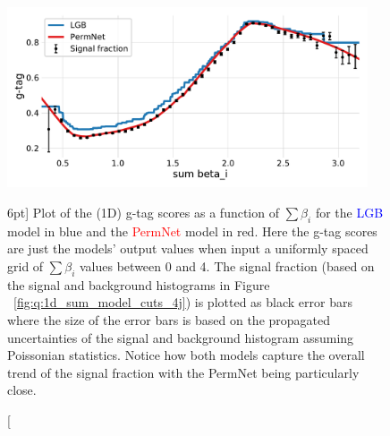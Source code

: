 \documentclass[a4paper, twoside, nobib]{tufte-book}
\newcommand{\figref}[1]{Figure ~\ref{#1}}
\begin{document}
\begin{figure}
  \includegraphics[width=0.95\textwidth, trim=10 10 10 20, clip]{figures/quarks/gtag_sum_models_njet=4-down_sample=1.00-ML_vars=vertex-selection=b-ejet_min=4-n_iter_RS_lgb=99-n_iter_RS_xgb=9-cdot_cut=0.90-version=19.pdf}
  \caption[1D Sum Models Predictions and Signal Fraction for 4-jets][6pt]
          {Plot of the (1D) g-tag scores as a function of $\sum \beta_i$ for the \textcolor{blue}{LGB} model in blue and the \textcolor{red}{PermNet} model in red. Here the g-tag scores are just the models' output values when input a uniformly spaced grid of $\sum \beta_i$ values between 0 and 4. The signal fraction (based on the signal and background histograms in \figref{fig:q:1d_sum_model_cuts_4j}) is plotted as black error bars where the size of the error bars is based on the propagated uncertainties of the signal and background histogram assuming Poissonian statistics. Notice how both models capture the overall trend of the signal fraction with the PermNet being particularly close. 
          } 
  \label{fig:q:1d_sum_models_signal_fraction_4j}
\end{figure}
\end{document}
